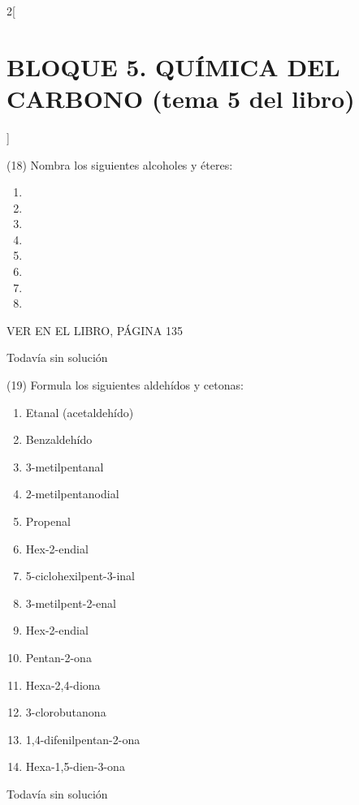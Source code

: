 \documentclass[10pt]{article}
\begin{document}
\begin{multicols}{2}[
  \section{BLOQUE 5. QUÍMICA DEL CARBONO (tema 5 del libro)}
  ]
\begin{exercise}
  (18) Nombra los siguientes alcoholes y éteres:
  \begin{enumerate}
    \item {}
    \item {}
    \item {}
    \item {}
    \item {}
    \item {}
    \item {}
    \item {}
  \end{enumerate}
  VER EN EL LIBRO, PÁGINA 135
\end{exercise}

\begin{solution}[print=false]
  Todavía sin solución
\end{solution}


\begin{exercise}
  (19) Formula los siguientes aldehídos y cetonas:
  \begin{enumerate}
    \item Etanal (acetaldehído)
    \item Benzaldehído
    \item 3-metilpentanal
    \item 2-metilpentanodial
    \item Propenal
    \item Hex-2-endial
    \item 5-ciclohexilpent-3-inal
    \item 3-metilpent-2-enal
    \item Hex-2-endial
    \item Pentan-2-ona
    \item Hexa-2,4-diona
    \item 3-clorobutanona
    \item 1,4-difenilpentan-2-ona
    \item Hexa-1,5-dien-3-ona
  \end{enumerate}
\end{exercise}

\begin{solution}[print=false]
  Todavía sin solución
\end{solution}


\end{multicols}
\end{document}
